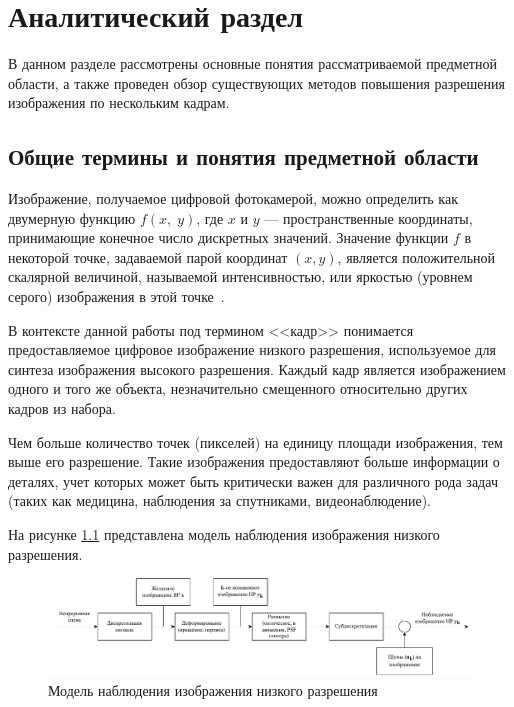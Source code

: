 \chapter{Аналитический раздел}

В данном разделе рассмотрены основные понятия рассматриваемой предметной области, а также проведен обзор существующих методов повышения разрешения изображения по нескольким кадрам.

\section{Общие термины и понятия предметной области}

Изображение, получаемое цифровой фотокамерой, можно определить как двумерную функцию $f(x,\;y)$, где $x$ и $y$ --- пространственные координаты, принимающие конечное число дискретных значений. Значение функции $f$ в некоторой точке, задаваемой парой координат $(x, y)$, является положительной скалярной величиной, называемой интенсивностью, или яркостью (уровнем серого) изображения в этой точке~\cite{digital_pic_1, digital_pic_2}. 

В контексте данной работы под термином <<кадр>> понимается предоставляемое цифровое изображение низкого разрешения, используемое для синтеза изображения высокого разрешения. Каждый кадр является изображением одного и того же объекта, незначительно смещенного относительно других кадров из набора.

Чем больше количество точек (пикселей) на единицу площади изображения, тем выше его разрешение. Такие изображения предоставляют больше информации о деталях, учет которых может быть критически важен для различного рода задач (таких как медицина, наблюдения за спутниками, видеонаблюдение).

На рисунке \ref{model} представлена модель наблюдения изображения низкого разрешения.

\begin{figure}[H]
	\centering
	\includegraphics[scale=0.6]{assets/model}
	\caption{Модель наблюдения изображения низкого разрешения}
	\label{model}
\end{figure}

